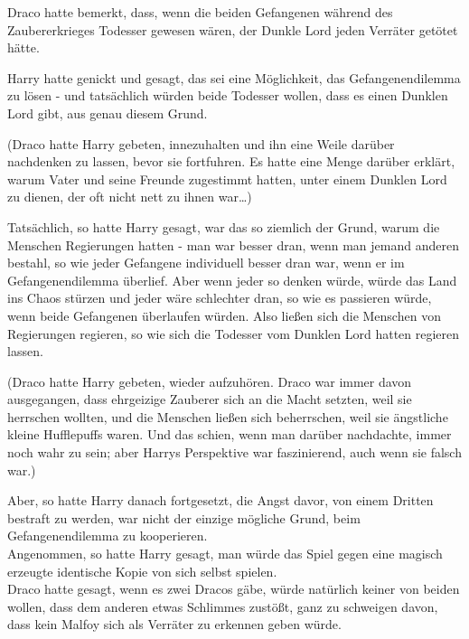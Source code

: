 {Draco hatte bemerkt, dass, wenn die beiden Gefangenen während des Zaubererkrieges Todesser gewesen wären, der Dunkle Lord jeden Verräter getötet hätte.

Harry hatte genickt und gesagt, das sei eine Möglichkeit, das Gefangenendilemma zu lösen - und tatsächlich würden beide Todesser wollen, dass es einen Dunklen Lord gibt, aus genau diesem Grund.

(Draco hatte Harry gebeten, innezuhalten und ihn eine Weile darüber nachdenken zu lassen, bevor sie fortfuhren. Es hatte eine Menge darüber erklärt, warum Vater und seine Freunde zugestimmt hatten, unter einem Dunklen Lord zu dienen, der oft nicht nett zu ihnen war…)

Tatsächlich, so hatte Harry gesagt, war das so ziemlich der Grund, warum die Menschen Regierungen hatten - man war besser dran, wenn man jemand anderen bestahl, so wie jeder Gefangene individuell besser dran war, wenn er im Gefangenendilemma überlief. Aber wenn jeder so denken würde, würde das Land ins Chaos stürzen und jeder wäre schlechter dran, so wie es passieren würde, wenn beide Gefangenen überlaufen würden. Also ließen sich die Menschen von Regierungen regieren, so wie sich die Todesser vom Dunklen Lord hatten regieren lassen.

(Draco hatte Harry gebeten, wieder aufzuhören. Draco war immer davon ausgegangen, dass ehrgeizige Zauberer sich an die Macht setzten, weil sie herrschen wollten, und die Menschen ließen sich beherrschen, weil sie ängstliche kleine Hufflepuffs waren. Und das schien, wenn man darüber nachdachte, immer noch wahr zu sein; aber Harrys Perspektive war faszinierend, auch wenn sie falsch war.)

Aber, so hatte Harry danach fortgesetzt, die Angst davor, von einem Dritten bestraft zu werden, war nicht der einzige mögliche Grund, beim Gefangenendilemma zu kooperieren.\\ Angenommen, so hatte Harry gesagt, man würde das Spiel gegen eine magisch erzeugte identische Kopie von sich selbst spielen.\\ Draco hatte gesagt, wenn es zwei Dracos gäbe, würde natürlich keiner von beiden wollen, dass dem anderen etwas Schlimmes zustößt, ganz zu schweigen davon, dass kein Malfoy sich als Verräter zu erkennen geben würde.

}
